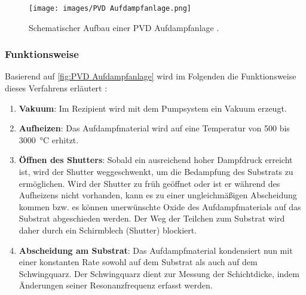 \documentclass{article} %
\begin{document}
\begin{figure}[htb!]
    \centering
    \texttt{[image: images/PVD Aufdampfanlage.png]} %
    \captionsetup{labelfont=bf} %
    \caption{Schematischer Aufbau einer PVD Aufdampfanlage \cite{keplinger2024}.}
    \label{fig:PVD Aufdampfanlage}
\end{figure}

\vspace{1em}
\subsubsection{Funktionsweise}
Basierend auf \autoref{fig:PVD Aufdampfanlage} wird im Folgenden die Funktionsweise dieses Verfahrens erläutert \cite{keplinger2024}:

\begin{enumerate}
    \item \textbf{Vakuum}: Im Rezipient wird mit dem Pumpsystem ein Vakuum erzeugt.
    \item \textbf{Aufheizen}: Das Aufdampfmaterial wird auf eine Temperatur von 500 bis 3000~°C erhitzt.
    \item \textbf{Öffnen des Shutters}: Sobald ein ausreichend hoher Dampfdruck erreicht ist, wird der Shutter weggeschwenkt, um die Bedampfung 
    des Substrats zu ermöglichen. Wird der Shutter zu früh geöffnet oder ist er während des Aufheizens nicht vorhanden, kann es zu einer 
    ungleichmäßigen Abscheidung kommen bzw. es können unerwünschte Oxide des Aufdampfmaterials auf das Substrat abgeschieden werden. Der Weg der
     Teilchen zum Substrat wird daher durch ein Schirmblech (Shutter) blockiert.
    \item \textbf{Abscheidung am Substrat}: Das Aufdampfmaterial kondensiert nun mit einer konstanten Rate sowohl auf dem Substrat als auch auf 
    dem Schwingquarz. Der Schwingquarz dient zur Messung der Schichtdicke, indem Änderungen seiner Resonanzfrequenz erfasst werden.
\end{enumerate}

\vspace{1em}
\end{document}
